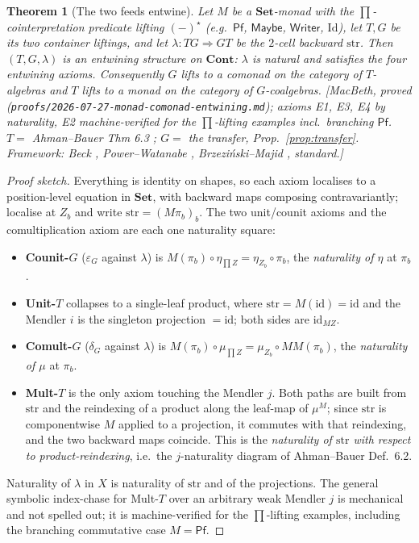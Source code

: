 \documentclass[11pt,a4paper]{book}
\newcommand{\Set}{\mathbf{Set}}
\newcommand{\Cont}{\mathbf{Cont}}
\newcommand{\id}{\mathrm{id}}
\newcommand{\str}{\mathrm{str}}
\theoremstyle{plain}
\newtheorem{Theorem}{Theorem}[chapter]
\theoremstyle{definition}
\theoremstyle{remark}
\newcommand{\prov}[1]{\hfill\textsf{\footnotesize[#1]}}
\begin{document}
\begin{Theorem}[The two feeds entwine]\label{thm:entwine}
Let $M$ be a $\Set$-monad with the $\prod$-cointerpretation predicate lifting $(-)^{\star}$
(e.g.\ $\mathsf{Pf}$, $\mathsf{Maybe}$, $\mathsf{Writer}$, $\mathrm{Id}$), let $T,G$ be its two container
liftings, and let $\lambda\colon TG\Rightarrow GT$ be the $2$-cell backward $\str$. Then $(T,G,\lambda)$
is an entwining structure on $\Cont$: $\lambda$ is natural and satisfies the four entwining axioms.
Consequently $G$ lifts to a comonad on the category of $T$-algebras and $T$ lifts to a monad on the
category of $G$-coalgebras.
\prov{MacBeth, proved (\texttt{proofs/2026-07-27-monad-comonad-entwining.md}); axioms E1, E3, E4 by
naturality, E2 machine-verified for the $\prod$-lifting examples incl.\ branching $\mathsf{Pf}$. $T=$
Ahman--Bauer Thm 6.3 \cite{AhmanBauer24}; $G=$ the transfer, Prop.~\ref{prop:transfer}. Framework:
Beck \cite{Beck69}, Power--Watanabe \cite{PowerWatanabe02}, Brzezi\'nski--Majid \cite{BrzezinskiMajid98},
standard.}
\end{Theorem}

\begin{proof}[Proof sketch]
Everything is identity on shapes, so each axiom localises to a position-level equation in $\Set$, with
backward maps composing contravariantly; localise at $Z_{b}$ and write $\str=(M\pi_{b})_{b}$. The two
unit/counit axioms and the comultiplication axiom are each one naturality square:
\begin{itemize}[nosep]
  \item \textbf{Counit-$G$} ($\varepsilon_{G}$ against $\lambda$) is $M(\pi_{b})\circ\eta_{\prod Z}
        =\eta_{Z_{b}}\circ\pi_{b}$, the \emph{naturality of $\eta$} at $\pi_{b}$.
  \item \textbf{Unit-$T$} collapses to a single-leaf product, where $\str=M(\id)=\id$ and the Mendler
        $i$ is the singleton projection $=\id$; both sides are $\id_{MZ}$.
  \item \textbf{Comult-$G$} ($\delta_{G}$ against $\lambda$) is $M(\pi_{b})\circ\mu_{\prod Z}
        =\mu_{Z_{b}}\circ MM(\pi_{b})$, the \emph{naturality of $\mu$} at $\pi_{b}$.
  \item \textbf{Mult-$T$} is the only axiom touching the Mendler $j$. Both paths are built from $\str$
        and the reindexing of a product along the leaf-map of $\mu^{M}$; since $\str$ is componentwise
        $M$ applied to a projection, it commutes with that reindexing, and the two backward maps
        coincide. This is the \emph{naturality of $\str$ with respect to product-reindexing}, i.e.\ the
        $j$-naturality diagram of Ahman--Bauer Def.~6.2.
\end{itemize}
Naturality of $\lambda$ in $X$ is naturality of $\str$ and of the projections. The general symbolic
index-chase for Mult-$T$ over an arbitrary weak Mendler $j$ is mechanical and not spelled out; it is
machine-verified for the $\prod$-lifting examples, including the branching commutative case
$M=\mathsf{Pf}$.
\end{proof}
\end{document}
